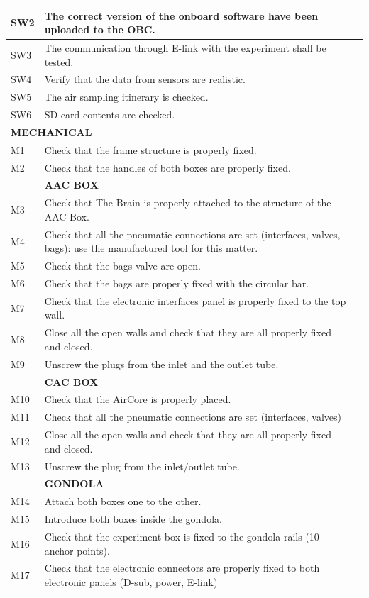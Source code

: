 \documentclass[a4paper,12pt,oneside]{article}
\begin{document}
\begin{appendices}
\begin{longtable} {|m{}|m{}|m{}|}
SW2 & The correct version of the onboard software have been uploaded to the OBC. & \\ \hline
SW3 & The communication through E-link with the experiment shall be tested. & \\ \hline
SW4 & Verify that the data from sensors are  realistic. & \\ \hline
SW5 & The air sampling itinerary is checked. & \\ \hline
SW6 & SD card contents are checked. & \\ \hline
\multicolumn{2}{|l|}{ \textbf{MECHANICAL} } & \\
\hline
M1 & Check that the frame structure is properly fixed. & \\
\hline
M2 & Check that the handles of both boxes are properly fixed. & \\
\hline
& \textbf{AAC BOX} & \\
\hline
M3 & Check that The Brain is properly attached to the structure of the AAC Box. & \\
\hline
M4 & Check that all the pneumatic connections are set (interfaces, valves, bags): use the manufactured tool for this matter. & \\
\hline
M5 & Check that the bags valve are open. & \\
\hline
M6 & Check that the bags are properly fixed with the circular bar. & \\
\hline
M7 & Check that the electronic interfaces panel is properly fixed to the top wall. & \\
\hline
M8 & Close all the open walls and check that they are all properly fixed and closed. & \\
\hline
M9 & Unscrew the plugs from the inlet and the outlet tube. & \\
\hline
& \textbf{CAC BOX} & \\
\hline
M10 & Check that the AirCore is properly placed. & \\
\hline
M11 & Check that all the pneumatic connections are set (interfaces, valves) & \\
\hline
M12 & Close all the open walls and check that they are all properly fixed and closed. & \\
\hline
M13 & Unscrew the plug from the inlet/outlet tube. & \\
\hline
& \textbf{GONDOLA} & \\
\hline
M14 &  Attach both boxes one to the other. & \\
\hline
M15 & Introduce both boxes inside the gondola. & \\
\hline
M16 & Check that the experiment box is fixed to the gondola rails (10 anchor points). & \\
\hline
M17 & Check that the electronic connectors are properly fixed to both electronic panels (D-sub, power, E-link) & \\
\hline



\end{longtable}
\end{appendices}
\end{document}
